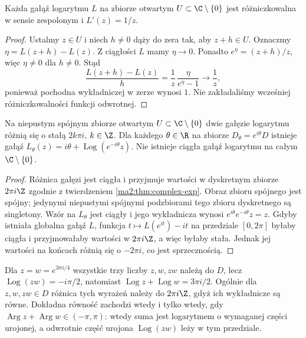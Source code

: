 \begin{twierdzenie}
\label{ma2:thm:log-derivative}
Każda gałąź logarytmu $L$ na zbiorze otwartym
$U\subset\C\setminus\{0\}$ jest różniczkowalna w sensie
zespolonym i $L'(z)=1/z$.
\end{twierdzenie}
\begin{proof}
Ustalmy $z\in U$ i niech $h\ne0$ dąży do zera tak, aby $z+h\in U$.
Oznaczmy $\eta=L(z+h)-L(z)$. Z ciągłości $L$ mamy $\eta\to0$.
Ponadto $e^\eta=(z+h)/z$, więc $\eta\ne0$ dla $h\ne0$.
Stąd
\[
 \frac{L(z+h)-L(z)}h
 =\frac1z\,\frac{\eta}{e^\eta-1}\longrightarrow\frac1z,
\]
ponieważ pochodna wykładniczej w zerze wynosi $1$.
Nie zakładaliśmy wcześniej różniczkowalności funkcji odwrotnej.
\end{proof}

\begin{twierdzenie}
\label{ma2:thm:log-branches}
Na niepustym spójnym zbiorze otwartym
$U\subset\C\setminus\{0\}$ dwie gałęzie logarytmu różnią się
o stałą $2k\pi i$, $k\in\Z$. Dla każdego $\theta\in\R$
na zbiorze $D_\theta=e^{i\theta}D$ istnieje gałąź
$L_\theta(z)=i\theta+\operatorname{Log}(e^{-i\theta}z)$.
Nie istnieje ciągła gałąź logarytmu na całym
$\C\setminus\{0\}$.
\end{twierdzenie}
\begin{proof}
Różnica gałęzi jest ciągła i przyjmuje wartości w dyskretnym
zbiorze $2\pi i\Z$ zgodnie z twierdzeniem
\ref{ma2:thm:complex-exp}. Obraz zbioru spójnego jest spójny;
jedynymi niepustymi spójnymi podzbiorami tego zbioru dyskretnego
są singletony. Wzór na $L_\theta$ jest ciągły i jego
wykładnicza wynosi $e^{i\theta}e^{-i\theta}z=z$.
Gdyby istniała globalna gałąź $L$, funkcja
$t\mapsto L(e^{it})-it$ na przedziale $[0,2\pi]$ byłaby ciągła
i przyjmowałaby wartości w $2\pi i\Z$, a więc byłaby stała.
Jednak jej wartości na końcach różnią się o $-2\pi i$,
co jest sprzecznością.
\end{proof}

\begin{przyklad}
Dla $z=w=e^{3\pi i/4}$ wszystkie trzy liczby $z,w,zw$
należą do $D$, lecz $\operatorname{Log}(zw)=-i\pi/2$,
natomiast $\operatorname{Log}z+\operatorname{Log}w=3\pi i/2$.
Ogólnie dla $z,w,zw\in D$ różnica tych wyrażeń należy do
$2\pi i\Z$, gdyż ich wykładnicze są równe. Dokładna równość
zachodzi wtedy i tylko wtedy, gdy
$\operatorname{Arg}z+\operatorname{Arg}w\in(-\pi,\pi)$:
wtedy suma jest logarytmem o wymaganej części urojonej,
a odwrotnie część urojona $\operatorname{Log}(zw)$ leży
w tym przedziale.
\end{przyklad}


